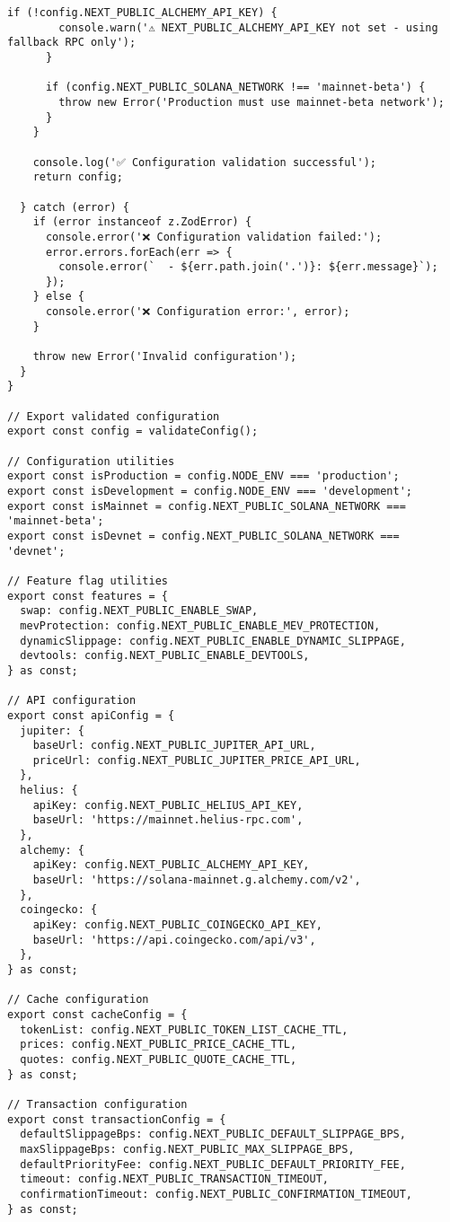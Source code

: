 \documentclass[11pt,a4paper]{article}
\begin{document}
\begin{lstlisting}[style=env, caption=src/utils/config-validation.ts]
      if (!config.NEXT_PUBLIC_ALCHEMY_API_KEY) {
        console.warn('⚠️ NEXT_PUBLIC_ALCHEMY_API_KEY not set - using fallback RPC only');
      }
      
      if (config.NEXT_PUBLIC_SOLANA_NETWORK !== 'mainnet-beta') {
        throw new Error('Production must use mainnet-beta network');
      }
    }
    
    console.log('✅ Configuration validation successful');
    return config;
    
  } catch (error) {
    if (error instanceof z.ZodError) {
      console.error('❌ Configuration validation failed:');
      error.errors.forEach(err => {
        console.error(`  - ${err.path.join('.')}: ${err.message}`);
      });
    } else {
      console.error('❌ Configuration error:', error);
    }
    
    throw new Error('Invalid configuration');
  }
}

// Export validated configuration
export const config = validateConfig();

// Configuration utilities
export const isProduction = config.NODE_ENV === 'production';
export const isDevelopment = config.NODE_ENV === 'development';
export const isMainnet = config.NEXT_PUBLIC_SOLANA_NETWORK === 'mainnet-beta';
export const isDevnet = config.NEXT_PUBLIC_SOLANA_NETWORK === 'devnet';

// Feature flag utilities
export const features = {
  swap: config.NEXT_PUBLIC_ENABLE_SWAP,
  mevProtection: config.NEXT_PUBLIC_ENABLE_MEV_PROTECTION,
  dynamicSlippage: config.NEXT_PUBLIC_ENABLE_DYNAMIC_SLIPPAGE,
  devtools: config.NEXT_PUBLIC_ENABLE_DEVTOOLS,
} as const;

// API configuration
export const apiConfig = {
  jupiter: {
    baseUrl: config.NEXT_PUBLIC_JUPITER_API_URL,
    priceUrl: config.NEXT_PUBLIC_JUPITER_PRICE_API_URL,
  },
  helius: {
    apiKey: config.NEXT_PUBLIC_HELIUS_API_KEY,
    baseUrl: 'https://mainnet.helius-rpc.com',
  },
  alchemy: {
    apiKey: config.NEXT_PUBLIC_ALCHEMY_API_KEY,
    baseUrl: 'https://solana-mainnet.g.alchemy.com/v2',
  },
  coingecko: {
    apiKey: config.NEXT_PUBLIC_COINGECKO_API_KEY,
    baseUrl: 'https://api.coingecko.com/api/v3',
  },
} as const;

// Cache configuration
export const cacheConfig = {
  tokenList: config.NEXT_PUBLIC_TOKEN_LIST_CACHE_TTL,
  prices: config.NEXT_PUBLIC_PRICE_CACHE_TTL,
  quotes: config.NEXT_PUBLIC_QUOTE_CACHE_TTL,
} as const;

// Transaction configuration
export const transactionConfig = {
  defaultSlippageBps: config.NEXT_PUBLIC_DEFAULT_SLIPPAGE_BPS,
  maxSlippageBps: config.NEXT_PUBLIC_MAX_SLIPPAGE_BPS,
  defaultPriorityFee: config.NEXT_PUBLIC_DEFAULT_PRIORITY_FEE,
  timeout: config.NEXT_PUBLIC_TRANSACTION_TIMEOUT,
  confirmationTimeout: config.NEXT_PUBLIC_CONFIRMATION_TIMEOUT,
} as const;
\end{lstlisting}
\end{document}

